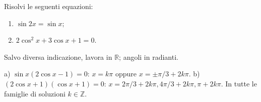 
\begin{esercizio}
Risolvi le seguenti equazioni: 

\begin{enumerate}
\item $\displaystyle\sin 2x=\sin x;$

\item $\displaystyle 2\cos^2 x+3\cos x+1=0.$
\end{enumerate}
Salvo diversa indicazione, lavora in $\mathbb R$; angoli in radianti.
\end{esercizio}

\begin{soluzione}
a) $\sin x(2\cos x-1)=0$:
$x=k\pi$ oppure $x=\pm\pi/3+2k\pi$.
b) $(2\cos x+1)(\cos x+1)=0$:
$x=2\pi/3+2k\pi,4\pi/3+2k\pi,\pi+2k\pi$. In tutte le famiglie di soluzioni $k\in\mathbb{Z}$.
\end{soluzione}
